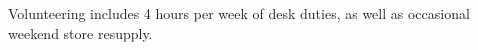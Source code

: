 {
    Volunteering includes 4 hours per week of desk duties, as well as occasional weekend store resupply.
}
  
